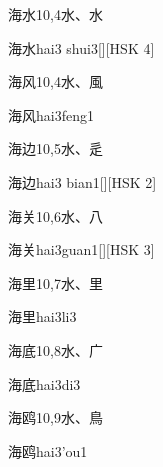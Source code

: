 \begin{entry}{海水}{10,4}{⽔、⽔}
  \begin{phonetics}{海水}{hai3 shui3}[][HSK 4]
  \end{phonetics}
\end{entry}

\begin{entry}{海风}{10,4}{⽔、⾵}
  \begin{phonetics}{海风}{hai3feng1}
  \end{phonetics}
\end{entry}

\begin{entry}{海边}{10,5}{⽔、⾡}
  \begin{phonetics}{海边}{hai3 bian1}[][HSK 2]
  \end{phonetics}
\end{entry}

\begin{entry}{海关}{10,6}{⽔、⼋}
  \begin{phonetics}{海关}{hai3guan1}[][HSK 3]
  \end{phonetics}
\end{entry}

\begin{entry}{海里}{10,7}{⽔、⾥}
  \begin{phonetics}{海里}{hai3li3}
  \end{phonetics}
\end{entry}

\begin{entry}{海底}{10,8}{⽔、⼴}
  \begin{phonetics}{海底}{hai3di3}
  \end{phonetics}
\end{entry}

\begin{entry}{海鸥}{10,9}{⽔、⿃}
  \begin{phonetics}{海鸥}{hai3'ou1}
  \end{phonetics}
\end{entry}

